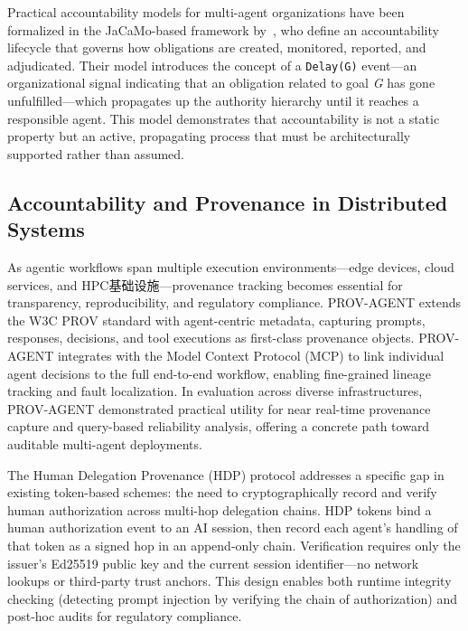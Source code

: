 Practical accountability models for multi-agent organizations have been formalized in the JaCaMo-based framework by~, who define an accountability lifecycle that governs how obligations are created, monitored, reported, and adjudicated. Their model introduces the concept of a \texttt{Delay(G)} event---an organizational signal indicating that an obligation related to goal \textit{G} has gone unfulfilled---which propagates up the authority hierarchy until it reaches a responsible agent. This model demonstrates that accountability is not a static property but an active, propagating process that must be architecturally supported rather than assumed.

\subsection{Accountability and Provenance in Distributed Systems}

As agentic workflows span multiple execution environments---edge devices, cloud services, and HPC基础设施---provenance tracking becomes essential for transparency, reproducibility, and regulatory compliance. PROV-AGENT \cite{prov-agent} extends the W3C PROV standard with agent-centric metadata, capturing prompts, responses, decisions, and tool executions as first-class provenance objects. PROV-AGENT integrates with the Model Context Protocol (MCP) to link individual agent decisions to the full end-to-end workflow, enabling fine-grained lineage tracking and fault localization. In evaluation across diverse infrastructures, PROV-AGENT demonstrated practical utility for near real-time provenance capture and query-based reliability analysis, offering a concrete path toward auditable multi-agent deployments.

The Human Delegation Provenance (HDP) protocol \cite{draft-hdp-agentic-delegation} addresses a specific gap in existing token-based schemes: the need to cryptographically record and verify human authorization across multi-hop delegation chains. HDP tokens bind a human authorization event to an AI session, then record each agent's handling of that token as a signed hop in an append-only chain. Verification requires only the issuer's Ed25519 public key and the current session identifier---no network lookups or third-party trust anchors. This design enables both runtime integrity checking (detecting prompt injection by verifying the chain of authorization) and post-hoc audits for regulatory compliance.

